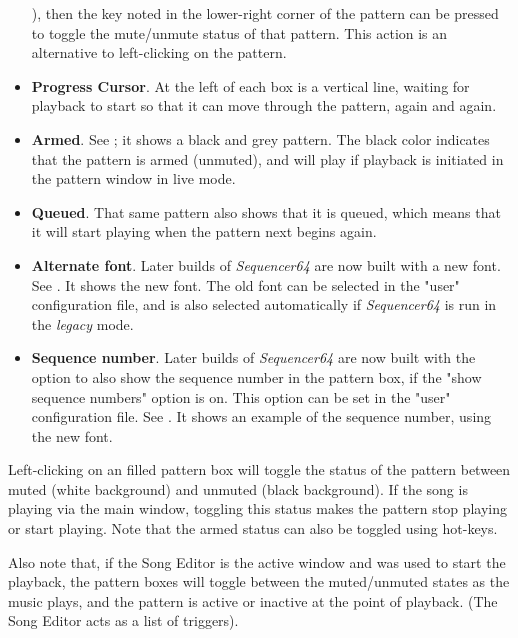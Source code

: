\begin{itemize}
         ),
         then the key noted in the lower-right corner of the pattern can be
         pressed to toggle the mute/unmute status of that pattern.
         This action is an alternative to left-clicking on the pattern.
      \item \textbf{Progress Cursor}.
         At the left of each box is a vertical line, waiting for playback to
         start so that it can move through the pattern, again and again.
      \item \textbf{Armed}.
         See ; it shows a black
         and grey pattern.  The black color indicates that the pattern is armed
         (unmuted), and will play if playback is initiated in the pattern
         window in live mode.
      \item \textbf{Queued}.
         That same pattern also shows that it is queued, which means that it
         will start playing when the pattern next begins again.
      \item \textbf{Alternate font}.
         Later builds of \textsl{Sequencer64} are now built with a new font.
         See .  It shows the new
         font. 
         The old font can be selected in the "user" configuration file, and is
         also selected automatically if \textsl{Sequencer64} is run in the
         \textsl{legacy} mode.
      \item \textbf{Sequence number}.
         Later builds of \textsl{Sequencer64} are now built with the option to
         also show the sequence number in the pattern box, if the "show
         sequence numbers" option is on.
         This option can be set in the "user" configuration file.
         See .  It shows an
         example of the sequence number, using the new font.
   \end{itemize}

   Left-clicking on an filled pattern box will toggle the status of the
   pattern between muted (white background) and unmuted (black background).
   If the song is playing via the main window, toggling this status makes
   the pattern stop playing or start playing.  Note that the armed status
   can also be toggled using hot-keys.

   Also note that, if the Song Editor is the active window and was used to
   start the playback, the pattern boxes will toggle between the muted/unmuted
   states as the music plays, and the pattern is active or inactive at the
   point of playback.  (The Song Editor acts as a list of triggers).

